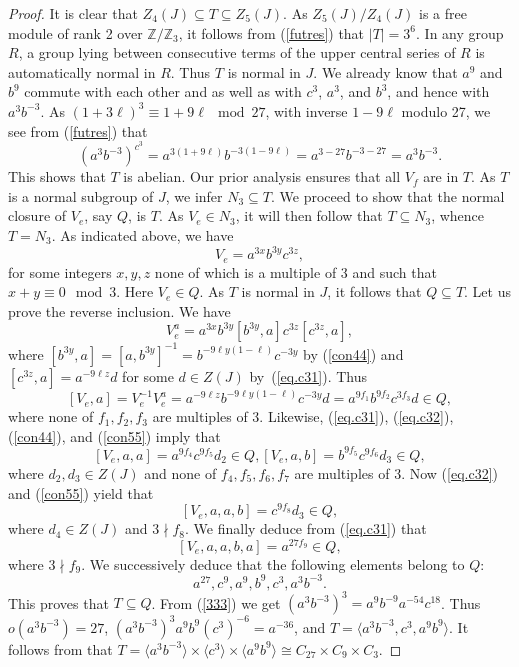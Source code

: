 \documentclass{amsart}
\theoremstyle{definition}
\theoremstyle{remark}
\newcommand \Z{{\mathbb Z}}
\begin{document}
{\begin{proof} It is clear that $Z_4(J)\subseteq T\subseteq Z_5(J)$. As $Z_5(J)/Z_4(J)$ is a free module of rank
2 over $\Z/\Z_3$, it follows from (\ref{futres}) that $|T|=3^6$. In any group $R$, a group lying between consecutive terms
of the upper central series of $R$ is automatically normal in $R$. Thus $T$ is normal in $J$. 
We already know that $a^9$ and $b^9$ commute with each other and
as well as with $c^3$, $a^3$, and $b^3$, and hence with $a^3b^{-3}$. As $(1+3\ell)^3\equiv 1+9\ell\mod 27$,
with inverse $1-9\ell$ modulo 27, we see from (\ref{futres}) that
$$
(a^3b^{-3})^{c^3}=a^{3(1+9\ell)}b^{-3(1-9\ell)}=a^{3-27}b^{-3-27}=a^3b^{-3}.
$$
This shows that $T$ is abelian. Our prior analysis ensures that all $V_f$ are in $T$. As $T$
is a normal subgroup of $J$, we infer $N_3\subseteq T$. We proceed to show that
the normal closure of $V_e$, say $Q$, is $T$. As $V_e\in N_3$, it will then follow that $T\subseteq N_3$,
whence $T=N_3$. As indicated above, we have
$$
V_e=a^{3x} b^{3y}c^{3z},
$$
for some integers $x,y,z$ none of which is a multiple of 3 and such that $x+y\equiv 0\mod 3$. Here $V_e\in Q$.
As $T$ is normal in $J$, it follows that $Q\subseteq T$. Let us prove the reverse inclusion. We have
$$
V_e^a=a^{3x} b^{3y} [b^{3y},a] c^{3z} [c^{3z},a],
$$
where $[b^{3y},a]=[a,b^{3y}]^{-1}=b^{-9\ell y(1-\ell)}c^{-3y}$ by (\ref{con44}) and $[c^{3z},a]=a^{-9\ell z}d$
for some $d\in Z(J)$ by~(\ref{eq.c31}). Thus 
$$[V_e,a]=V_e^{-1} V_e^a=a^{-9\ell z}b^{-9\ell y(1-\ell)}c^{-3y}d=a^{9f_1}b^{9f_2}c^{3f_3}d\in Q,
$$
where none of $f_1,f_2,f_3$ are multiples of 3. Likewise, (\ref{eq.c31}), (\ref{eq.c32}), (\ref{con44}), and (\ref{con55}) imply that
$$
[V_e,a,a]=a^{9f_4}c^{9f_5}d_2\in Q, [V_e,a,b]=b^{9f_5}c^{9f_6}d_3\in Q,
$$
where $d_2,d_3\in Z(J)$ and none of $f_4,f_5,f_6,f_7$ are multiples of 3. Now
(\ref{eq.c32}) and (\ref{con55}) yield that
$$
[V_e,a,a,b]=c^{9f_8}d_3\in Q,
$$
where $d_4\in Z(J)$ and $3\nmid f_8$. We finally deduce from (\ref{eq.c31}) that
$$
[V_e,a,a,b,a]=a^{27 f_9}\in Q,
$$
where $3\nmid f_9$. We successively deduce that the following elements belong to $Q$:
$$
a^{27}, c^{9}, a^{9}, b^9, c^3, a^3b^{-3}.
$$
This proves that $T\subseteq Q$. From (\ref{333}) we get $(a^3 b^{-3})^3=a^9 b^{-9} a^{-54} c^{18}$.
Thus $o(a^3 b^{-3})=27$, $(a^3 b^{-3})^3 a^9 b^9 (c^3)^{-6}=a^{-36}$, and
$T=\langle a^3b^{-3}, c^3, a^9b^9\rangle$. It follows from \cite[Theorem 7.1]{MS} that 
$T=\langle a^3b^{-3}\rangle\times \langle c^3\rangle\times \langle a^9b^9\rangle\cong C_{27}\times C_9\times C_3$.
\end{proof}

}
\end{document}
